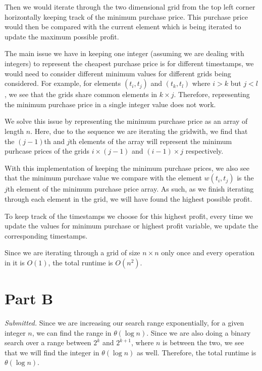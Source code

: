 \documentclass[12pt,twoside]{article}
\begin{document}
\begin{problems}
\par Then we would iterate through the two dimensional grid from the top left corner horizontally keeping track of the minimum purchase price. This purchase price would then be compared with the current element which is being iterated to update the maximum possible profit.
\par The main issue we have in keeping one integer (assuming we are dealing with integers) to represent the cheapest purchase price is for different timestamps, we would need to consider different minimum values for different grids being considered. For example, for elements $(t_i, t_j)$ and $(t_k,t_l)$ where $i>k$ but $j<l$, we see that the grids share common elements in $k \times j$. Therefore, representing the minimum purchase price in a single integer value does not work.
\par We solve this issue by representing the minimum purchase price as an array of length $n$. Here, due to the sequence we are iterating the gridwith, we find that the $(j-1)$th and $j$th elements of the array will represent the minimum purhcase prices of the grids $i \times (j-1)$ and $(i-1) \times j$ respectively.
\par With this implementation of keeping the minimum purchase prices, we also see that the minimum purchase value we compare with the element $w(t_i, t_j)$ is the $j$th element of the minimum purchase price array. As such, as we finish iterating through each element in the grid, we will have found the highest possible profit.
\par To keep track of the timestamps we choose for this highest profit, every time we update the values for minimum purchase or highest profit variable, we update the corresponding timestamps.
\par Since we are iterating through a grid of size $n \times n$ only once and every operation in it is $O(1)$, the total runtime is $O(n^2)$.
\section*{Part B}
\problem  %
\begin{problemparts}
\problempart
\emph{Submitted.}
\problempart
Since we are increasing our search range exponentially, for a given integer $n$, we can find the range in $\theta( \log n)$. Since we are also doing a binary search over a range between $2^k$ and $2^{k+1}$, where $n$ is between the two, we see that we will find the integer in $\theta( \log n)$ as well. Therefore, the total runtime is $\theta( \log n)$.
\end{problemparts}
\end{problems}
\end{document}
